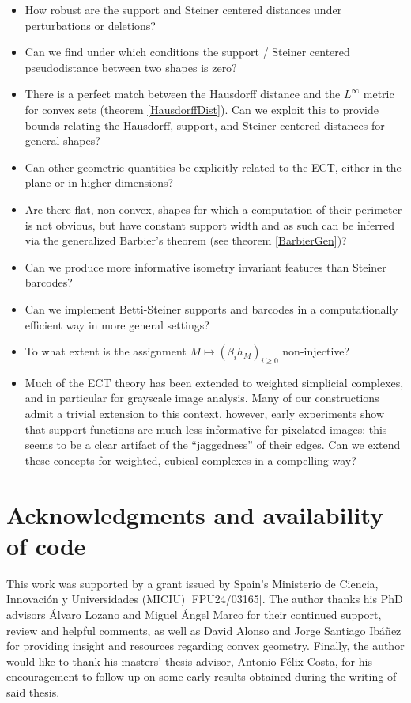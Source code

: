 \documentclass[a4paper]{article}
\begin{document}
\begin{itemize}
	\item How robust are the support and Steiner centered distances under perturbations or deletions?
	\item Can we find under which conditions the support / Steiner centered pseudodistance between two shapes is zero?
	\item There is a perfect match between the Hausdorff distance and the $L^\infty$ metric for convex sets (theorem \ref{HausdorffDist}). Can we exploit this to provide bounds relating the Hausdorff, support, and Steiner centered distances for general shapes?
	\item Can other geometric quantities be explicitly related to the ECT, either in the plane or in higher dimensions?
	\item Are there flat, non-convex, shapes for which a computation of their perimeter is not obvious, but have constant support width and as such can be inferred via the generalized Barbier's theorem (see theorem \ref{BarbierGen})?
	\item Can we produce more informative isometry invariant features than Steiner barcodes?
	\item Can we implement Betti-Steiner supports and barcodes in a computationally efficient way in more general settings?
	\item To what extent is the assignment $M \mapsto (\beta_ih_M)_{i \geq 0}$ non-injective?
	\item Much of the ECT theory has been extended to weighted simplicial complexes, and in particular for grayscale image analysis. Many of our constructions admit a trivial extension to this context, however, early experiments show that support functions are much less informative for pixelated images: this seems to be a clear artifact of the ``jaggedness'' of their edges. Can we extend these concepts for weighted, cubical complexes in a compelling way?
\end{itemize}


\section*{Acknowledgments and availability of code}
This work was supported by a grant issued by Spain's Ministerio de Ciencia, Innovación y Universidades (MICIU) [FPU24/03165]. The author thanks his PhD advisors Álvaro Lozano and Miguel Ángel Marco for their continued support, review and helpful comments, as well as David Alonso and Jorge Santiago Ibáñez for providing insight and resources regarding convex geometry. Finally, the author would like to thank his masters' thesis advisor, Antonio Félix Costa, for his encouragement to follow up on some early results obtained during the writing of said thesis.
\end{document}
